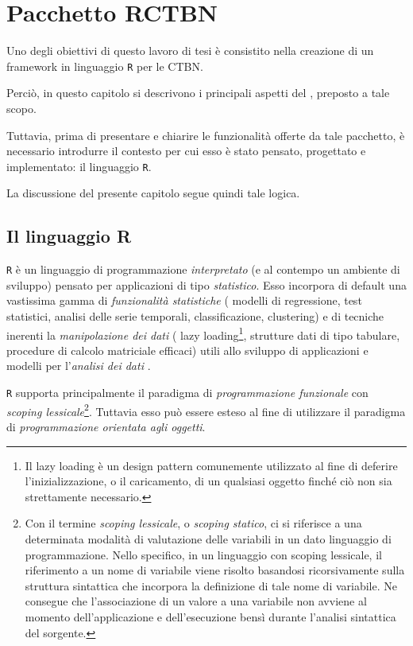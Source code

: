 
\chapter{Pacchetto RCTBN}
\label{cap:ctbnr}
Uno degli obiettivi di questo lavoro di tesi è consistito nella creazione di un framework in linguaggio \lstinline$R$ per le \acs{CTBN}.

Perciò, in questo capitolo si descrivono i principali aspetti del \pacchettor{}, preposto a tale scopo.

Tuttavia, prima di presentare e chiarire le funzionalità offerte da tale pacchetto, è necessario introdurre il contesto per cui esso è stato pensato, progettato e implementato: il linguaggio \lstinline$R$.

La discussione del presente capitolo segue quindi tale logica.

\section{Il linguaggio R}\label{sec:roverview}
\lstinline$R$ è un linguaggio di programmazione \emph{interpretato} (e al contempo un ambiente di sviluppo) pensato per applicazioni di tipo \emph{statistico}. Esso incorpora di default una vastissima gamma di \emph{funzionalità statistiche} (\eg{} modelli di regressione, test statistici, analisi delle serie temporali, classificazione, clustering) e di tecniche inerenti la \emph{manipolazione dei dati} (\eg{} lazy loading\footnote{Il lazy loading è un design pattern comunemente utilizzato al fine di deferire l'inizializzazione, o il caricamento, di un qualsiasi oggetto finché ciò non sia strettamente necessario.}, strutture dati di tipo tabulare, procedure di calcolo matriciale efficaci) utili allo sviluppo di applicazioni e modelli per l'\emph{analisi dei dati} \citep{R2013}.

\lstinline$R$ supporta principalmente il paradigma di \emph{programmazione funzionale} con \emph{scoping lessicale}\footnote{Con il termine \emph{scoping lessicale}, o \emph{scoping statico}, ci si riferisce a una determinata modalità di valutazione delle variabili in un dato linguaggio di programmazione. Nello specifico, in un linguaggio con scoping lessicale, il riferimento a un nome di variabile viene risolto basandosi ricorsivamente sulla struttura sintattica che incorpora la definizione di tale nome di variabile. Ne consegue che l'associazione di un valore a una variabile non avviene al momento dell'applicazione e dell'esecuzione bensì durante l'analisi sintattica del sorgente.}. Tuttavia esso può essere esteso al fine di utilizzare il paradigma di \emph{programmazione orientata agli oggetti}.

